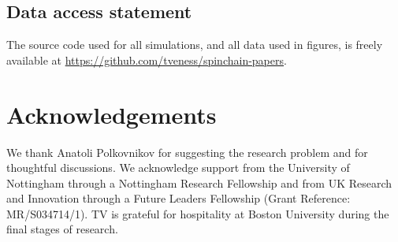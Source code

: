 \documentclass[aps,pre,twocolumn,notitlepage,floats,10pt]{revtex4-1}
\begin{document}
\subsection*{Data access statement}
The source code used for all simulations, and all data used in figures, is
freely available at \url{https://github.com/tveness/spinchain-papers}.

\section*{Acknowledgements}
We thank Anatoli Polkovnikov for suggesting the research problem and for
thoughtful discussions.
We acknowledge support from the University of Nottingham through a Nottingham
Research Fellowship and from UK Research and Innovation through a Future Leaders
Fellowship (Grant Reference: MR/S034714/1).
TV is grateful for hospitality at Boston University during the final stages of
research.
\end{document}
